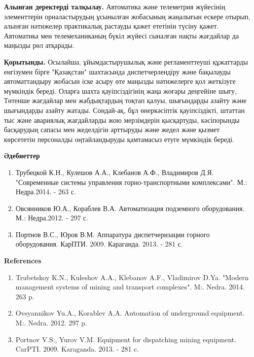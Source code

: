 \begin{multicols}{2}
{\bfseries Алынған деректерді талқылау.} Автоматика және телеметрия
жүйесінің элементтерін орналастырудың ұсынылған жобасының жаңалығын
ескере отырып, алынған нәтижелер практикалық растауды қажет ететінін
түсіну қажет. Автоматика мен телемеханиканың бүкіл жүйесі сыналған нақты
жағдайлар да маңызды рөл атқарады.

{\bfseries Қорытынды.} Осылайша, ұйымдастырушылық және регламенттеуші
құжаттарды енгізумен бірге "Қазақстан" шахтасында диспетчерлендіру және
бақылауды автоматтандыру жобасын іске асыру өте маңызды нәтижелерге қол
жеткізуге мүмкіндік береді. Оларға шахта қауіпсіздігінің жаңа жоғары
деңгейіне шығу, Төтенше жағдайлар мен жабдықтардың тоқтап қалуы,
шығындарды азайту және шығындарды азайту жатады. Сондай-ақ, бұл
өнеркәсіптік қауіпсіздікті, штаттан тыс және авариялық жағдайларды жою
мерзімдерін қысқартуды, кәсіпорынды басқарудың сапасы мен жеделдігін
арттыруды және жедел және қызмет көрсететін персоналды оңтайландыруды
қамтамасыз етуге мүмкіндік береді.
\end{multicols}

\begin{center}
{\bfseries Әдебиеттер}
\end{center}

\begin{enumerate}
\item
Трубецкой К.Н., Кулешов А.А., Клебанов А.Ф., Владимиров Д.Я.
"Современные системы управления горно-транспортными комплексами". М.:
Недра.2014. - 263 с.

\item
Овсянников Ю.А., Кораблев В.А. Автоматизация подземного оборудования.
М.: Недра.2012. - 297 с.

\item
Портнов В.С., Юров В.М. Аппаратура диспетчеризации горного
оборудования. КарПТИ. 2009. Караганда. 2013. - 281 с.
\end{enumerate}

\begin{center}
{\bfseries References}
\end{center}

\begin{enumerate}
\item
Trubetskoy K.N., Kuleshov A.A., Klebanov A.F., Vladimirov D.Ya.
"Modern management systems of mining and transport complexes". M:.
Nedra. 2014. 263 p.

\item
Ovsyannikov Yu.A., Korablev A.A. Automation of underground equipment.
M:. Nedra. 2012. 297 p.

\item
Portnov V.S., Yurov V.M. Equipment for dispatching mining equipment.
CarPTI. 2009. Karaganda. 2013. - 281 c.
\end{enumerate}

